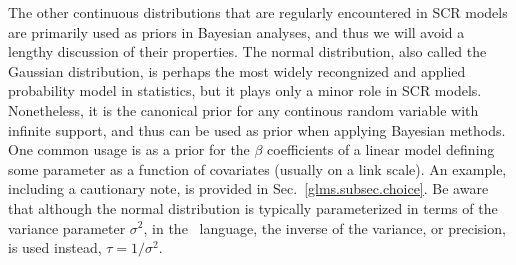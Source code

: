 The other continuous distributions that are regularly encountered in SCR
models are %
primarily used as priors in Bayesian analyses, and thus we will avoid
a lengthy discussion of their properties. %
The normal distribution, also called the Gaussian
distribution, is perhaps the most widely recongnized and applied probability model in
statistics, but it plays only a minor role in SCR models. %
Nonetheless, it
is the canonical prior for any continous random variable with
infinite support, and thus can be used as prior when applying Bayesian
methods. One common usage is as a prior for the $\beta$
coefficients of a linear model defining some parameter as a function
of covariates (usually on a link scale). An example, including a
cautionary note, is provided in Sec.~\ref{glms.subsec.choice}.
Be aware that although the normal distribution is typically
parameterized in terms of the variance parameter $\sigma^2$, in
the \bugs~language, the inverse of the variance, or precision, is used
instead, $\tau = 1/\sigma^2$.

